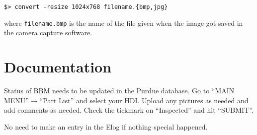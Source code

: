 \documentclass[12pt]{unlsilabsop}
\begin{document}
\medskip

\texttt{\$> convert -resize 1024x768 filename.\{bmp,jpg\}} 
\medskip

where \texttt{filename.bmp} is the name of the file given when the image got saved in the camera capture software.

\section{Documentation}
Status of BBM needs to be updated in the Purdue database. Go to ``MAIN MENU''$\rightarrow$``Part List'' and select your HDI. Upload any pictures as needed and add comments as needed. Check the tickmark on ``Inspected'' and hit ``SUBMIT''. 

No need to make an entry in the Elog if nothing special happened.
\end{document}
